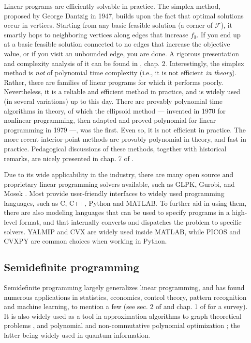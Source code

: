 			Linear programs are efficiently solvable in practice. The simplex method, proposed by George Dantzig in 1947, builds upon the fact that optimal solutions occur in vertices. Starting from any basic feasible solution (a corner of $\mathcal{F}$), it smartly hops to neighboring vertices along edges that increase $f_0$. If you end up at a basic feasible solution connected to no edges that increase the objective value, or if you visit an unbounded edge, you are done. A rigorous presentation and complexity analysis of it can be found in \cite{papadimitriou1998combinatorial}, chap. 2. Interestingly, the simplex method is \emph{not} of polynomial time complexity (i.e., it is not efficient \emph{in theory}). Rather, there are families of linear programs for which it performs poorly. Nevertheless, it is a reliable and efficient method in practice, and is widely used (in several variations) up to this day. There are provably polynomial time algorithms in theory, of which the ellipsoid method --- invented in 1970 for nonlinear programming, then adapted and proved polynomial for linear programming in 1979 ---, was the first. Even so, it is not efficient in practice. The more recent interior-point methods are provably polynomial in theory, and fast in practice. Pedagogical discussions of these methods, together with historical remarks, are nicely presented in chap. 7 of \cite{matousek2007understanding}.

			Due to its wide applicability in the industry, there are many open source and proprietary linear programming solvers available, such as GLPK, Gurobi, and Mosek \cite{glpk,gurobi,mosek}. Most provide user-friendly interfaces to widely used programming languages, such as C, C++, Python and MATLAB. To further aid in using them, there are also modeling languages that can be used to specify programs in a high-level format, and that internally converts and dispatches the problem to specific solvers. YALMIP \cite{yalmip} and CVX \cite{cvx} are widely used inside MATLAB, while PICOS \cite{picos} and CVXPY \cite{cvxpy} are common choices when working in Python.	


		\subsection{Semidefinite programming}
		\label{sec:sdp}

			Semidefinite programming largely generalizes linear programming, and has found numerous applications in statistics, economics, control theory, pattern recognition and machine learning, to mention a few (see sec. 2 of \cite{vandenberghe_sdp_1996} and chap. 1 of \cite{boyd_convexoptimization_2004} for a survey). It is also widely used as a tool in approximation algorithms to graph theoretical problems \cite{gartner2012approximation}, and polynomial and non-commutative polynomial optimization \cite{npa_prl_2007,npa_njp_2008}; the latter being widely used in quantum information.

